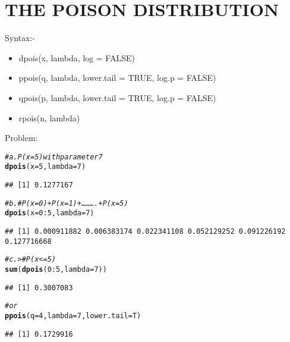 \documentclass{article}\usepackage[]{graphicx}\usepackage[]{xcolor}
\makeatletter
\newcommand{\hlnum}[1]{\textcolor[rgb]{0.686,0.059,0.569}{#1}}%
\newcommand{\hlcom}[1]{\textcolor[rgb]{0.678,0.584,0.686}{\textit{#1}}}%
\newcommand{\hlopt}[1]{\textcolor[rgb]{0,0,0}{#1}}%
\newcommand{\hldef}[1]{\textcolor[rgb]{0.345,0.345,0.345}{#1}}%
\newcommand{\hlkwc}[1]{\textcolor[rgb]{0.333,0.667,0.333}{#1}}%
\newcommand{\hlkwd}[1]{\textcolor[rgb]{0.737,0.353,0.396}{\textbf{#1}}}%
\newenvironment{kframe}{%
 \def\at@end@of@kframe{}%
 \ifinner\ifhmode%
  \def\at@end@of@kframe{\end{minipage}}%
  \begin{minipage}{\columnwidth}%
 \fi\fi%
 \def\FrameCommand##1{\hskip\@totalleftmargin \hskip-\fboxsep
 \colorbox{shadecolor}{##1}\hskip-\fboxsep
     \hskip-\linewidth \hskip-\@totalleftmargin \hskip\columnwidth}%
 \MakeFramed {\advance\hsize-\width
   \@totalleftmargin\z@ \linewidth\hsize
   \@setminipage}}%
 {\par\unskip\endMakeFramed%
 \at@end@of@kframe}
\newenvironment{knitrout}{}{} %
\makeatother
\begin{document}
\section{THE POISON DISTRIBUTION}
Syntax:-
\begin{itemize}
\item 	dpois(x, lambda, log = FALSE)
\item 	ppois(q, lambda, lower.tail = TRUE, log.p = FALSE)
\item 	qpois(p, lambda, lower.tail = TRUE, log.p = FALSE)
\item 	rpois(n, lambda)
\end{itemize}
Problem:
\begin{knitrout}
\color{fgcolor}\begin{kframe}
\begin{alltt}
\hlcom{# a. P(x=5) with parameter 7}
\hlkwd{dpois}\hldef{(}\hlkwc{x}\hldef{=}\hlnum{5}\hldef{,}\hlkwc{lambda}\hldef{=}\hlnum{7}\hldef{)}
\end{alltt}
\begin{verbatim}
## [1] 0.1277167
\end{verbatim}
\end{kframe}
\end{knitrout}
\begin{knitrout}
\color{fgcolor}\begin{kframe}
\begin{alltt}
\hlcom{# b. #P(x=0)+P(x=1)+……….+P(x=5)}
\hlkwd{dpois}\hldef{(}\hlkwc{x}\hldef{=}\hlnum{0}\hlopt{:}\hlnum{5}\hldef{,}\hlkwc{lambda}\hldef{=}\hlnum{7}\hldef{)}
\end{alltt}
\begin{verbatim}
## [1] 0.000911882 0.006383174 0.022341108 0.052129252 0.091226192 0.127716668
\end{verbatim}
\end{kframe}
\end{knitrout}
\begin{knitrout}
\color{fgcolor}\begin{kframe}
\begin{alltt}
\hlcom{# c. > #P(x<=5)}
\hlkwd{sum}\hldef{(}\hlkwd{dpois}\hldef{(}\hlnum{0}\hlopt{:}\hlnum{5}\hldef{,}\hlkwc{lambda}\hldef{=}\hlnum{7}\hldef{))}
\end{alltt}
\begin{verbatim}
## [1] 0.3007083
\end{verbatim}
\begin{alltt}
\hlcom{# or }
\hlkwd{ppois}\hldef{(}\hlkwc{q}\hldef{=}\hlnum{4}\hldef{,}\hlkwc{lambda}\hldef{=}\hlnum{7}\hldef{,}\hlkwc{lower.tail}\hldef{=T)}
\end{alltt}
\begin{verbatim}
## [1] 0.1729916
\end{verbatim}
\end{kframe}
\end{knitrout}
\end{document}
